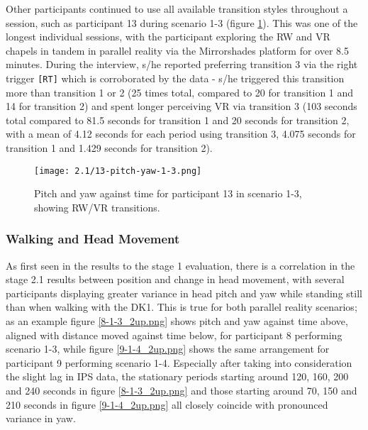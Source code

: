 Other participants continued to use all available transition styles throughout a session, such as participant 13 during scenario 1-3 (figure \ref{13-pitch-yaw-1-3.png}). This was one of the longest individual sessions, with the participant exploring the RW and VR chapels in tandem in parallel reality via the Mirrorshades platform for over 8.5 minutes. During the interview, s/he reported preferring transition 3 via the right trigger \texttt{[RT]} which is corroborated by the data - s/he triggered this transition more than transition 1 or 2 (25 times total, compared to 20 for transition 1 and 14 for transition 2) and spent longer perceiving VR via transition 3 (103 seconds total compared to 81.5 seconds for transition 1 and 20 seconds for transition 2, with a mean of 4.12 seconds for each period using transition 3, 4.075 seconds for transition 1 and 1.429 seconds for transition 2).

\begin{figure}[h]
	\begin{center}
	\texttt{[image: 2.1/13-pitch-yaw-1-3.png]}
	\caption{Pitch and yaw against time for participant 13 in scenario 1-3, showing RW/VR transitions.}
	\label{13-pitch-yaw-1-3.png}
	\end{center}
\end{figure}


\subsubsection{Walking and Head Movement}

As first seen in the results to the stage 1 evaluation, there is a correlation in the stage 2.1 results between position and change in head movement, with several participants displaying greater variance in head pitch and yaw while standing still than when walking with the DK1. This is true for both parallel reality scenarios; as an example figure \ref{8-1-3_2up.png} shows pitch and yaw against time above, aligned with distance moved against time below, for participant 8 performing scenario 1-3, while figure \ref{9-1-4_2up.png} shows the same arrangement for participant 9 performing scenario 1-4. Especially after taking into consideration the slight lag in IPS data, the stationary periods starting around 120, 160, 200 and 240 seconds in figure \ref{8-1-3_2up.png} and those starting around 70, 150 and 210 seconds in figure \ref{9-1-4_2up.png} all closely coincide with pronounced variance in yaw.

